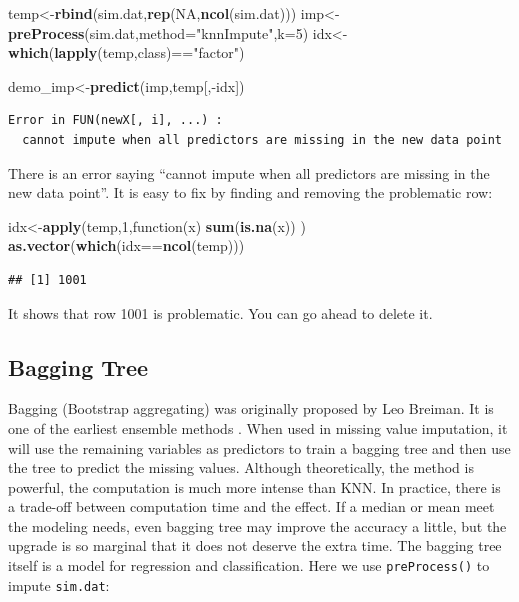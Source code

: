 \documentclass[12pt,]{krantz}
\newenvironment{Shaded}{\begin{snugshade}}{\end{snugshade}}
\newcommand{\KeywordTok}[1]{\textcolor[rgb]{0.13,0.29,0.53}{\textbf{{#1}}}}
\newcommand{\DataTypeTok}[1]{\textcolor[rgb]{0.13,0.29,0.53}{{#1}}}
\newcommand{\DecValTok}[1]{\textcolor[rgb]{0.00,0.00,0.81}{{#1}}}
\newcommand{\StringTok}[1]{\textcolor[rgb]{0.31,0.60,0.02}{{#1}}}
\newcommand{\OtherTok}[1]{\textcolor[rgb]{0.56,0.35,0.01}{{#1}}}
\newcommand{\NormalTok}[1]{{#1}}
\theoremstyle{definition}
\theoremstyle{definition}
\theoremstyle{remark}
\begin{document}
\begin{Shaded}
\begin{Highlighting}[]
\NormalTok{temp<-}\KeywordTok{rbind}\NormalTok{(sim.dat,}\KeywordTok{rep}\NormalTok{(}\OtherTok{NA}\NormalTok{,}\KeywordTok{ncol}\NormalTok{(sim.dat)))}
\NormalTok{imp<-}\KeywordTok{preProcess}\NormalTok{(sim.dat,}\DataTypeTok{method=}\StringTok{"knnImpute"}\NormalTok{,}\DataTypeTok{k=}\DecValTok{5}\NormalTok{)}
\NormalTok{idx<-}\KeywordTok{which}\NormalTok{(}\KeywordTok{lapply}\NormalTok{(temp,class)==}\StringTok{"factor"}\NormalTok{)}
\end{Highlighting}
\end{Shaded}

\begin{Shaded}
\begin{Highlighting}[]
\NormalTok{demo_imp<-}\KeywordTok{predict}\NormalTok{(imp,temp[,-idx])}
\end{Highlighting}
\end{Shaded}

\begin{verbatim}
Error in FUN(newX[, i], ...) : 
  cannot impute when all predictors are missing in the new data point
\end{verbatim}

There is an error saying ``cannot impute when all predictors are missing
in the new data point''. It is easy to fix by finding and removing the
problematic row:

\begin{Shaded}
\begin{Highlighting}[]
\NormalTok{idx<-}\KeywordTok{apply}\NormalTok{(temp,}\DecValTok{1}\NormalTok{,function(x) }\KeywordTok{sum}\NormalTok{(}\KeywordTok{is.na}\NormalTok{(x)) )}
\KeywordTok{as.vector}\NormalTok{(}\KeywordTok{which}\NormalTok{(idx==}\KeywordTok{ncol}\NormalTok{(temp)))}
\end{Highlighting}
\end{Shaded}

\begin{verbatim}
## [1] 1001
\end{verbatim}

It shows that row 1001 is problematic. You can go ahead to delete it.

\subsection{Bagging Tree}\label{bagging-tree}

Bagging (Bootstrap aggregating) was originally proposed by Leo Breiman.
It is one of the earliest ensemble methods \citep{bag1}. When used in
missing value imputation, it will use the remaining variables as
predictors to train a bagging tree and then use the tree to predict the
missing values. Although theoretically, the method is powerful, the
computation is much more intense than KNN. In practice, there is a
trade-off between computation time and the effect. If a median or mean
meet the modeling needs, even bagging tree may improve the accuracy a
little, but the upgrade is so marginal that it does not deserve the
extra time. The bagging tree itself is a model for regression and
classification. Here we use \texttt{preProcess()} to impute
\texttt{sim.dat}:
\end{document}
